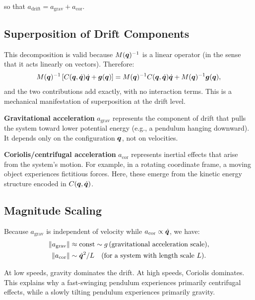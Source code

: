 so that $a_{\text{drift}} = a_{\text{grav}} + a_{\text{cor}}$.

\subsection{Superposition of Drift Components}

This decomposition is valid because $M(\bm{q})^{-1}$ is a linear operator (in the sense that
it acts linearly on vectors). Therefore:
\begin{equation}
M(\bm{q})^{-1}\left[C(\bm{q},\dot{\bm{q}})\dot{\bm{q}} + \bm{g}(\bm{q})\right]
= M(\bm{q})^{-1}C(\bm{q},\dot{\bm{q}})\dot{\bm{q}} + M(\bm{q})^{-1}\bm{g}(\bm{q}),
\end{equation}
and the two contributions add exactly, with no interaction terms. This is a mechanical
manifestation of superposition at the drift level.

\begin{intuitionbox}
\textbf{Gravitational acceleration} $a_{\text{grav}}$ represents the component of drift that
pulls the system toward lower potential energy (e.g., a pendulum hanging downward). It
depends only on the configuration $\bm{q}$, not on velocities.

\textbf{Coriolis/centrifugal acceleration} $a_{\text{cor}}$ represents inertial effects that
arise from the system's motion. For example, in a rotating coordinate frame, a moving object
experiences fictitious forces. Here, these emerge from the kinetic energy structure encoded
in $C(\bm{q},\dot{\bm{q}})$.
\end{intuitionbox}

\subsection{Magnitude Scaling}

Because $a_{\text{grav}}$ is independent of velocity while $a_{\text{cor}} \propto \dot{\bm{q}}$,
we have:
\begin{align}
\left\lVert a_{\text{grav}} \right\rVert &\approx \text{const} \sim g \, (\text{gravitational acceleration scale}),\\
\left\lVert a_{\text{cor}} \right\rVert &\sim \dot{\bm{q}}^2 / L \quad (\text{for a system with length scale } L).
\end{align}

At low speeds, gravity dominates the drift. At high speeds, Coriolis dominates. This
explains why a fast-swinging pendulum experiences primarily centrifugal effects, while a
slowly tilting pendulum experiences primarily gravity.

